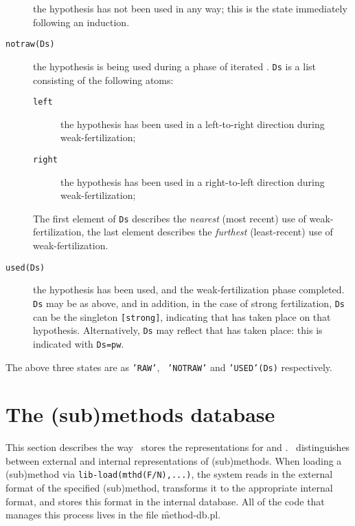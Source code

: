 \begin{description}
\item [] the hypothesis has
not been used in any way; this is the state immediately following an
induction.  

\item [{\tt notraw(Ds)}] the hypothesis is being used during a
phase of iterated .  {\tt Ds} is a list
consisting of the following atoms:
\begin{description}
\item [{\tt left}] the hypothesis has been used in a left-to-right
direction during weak-fertilization;
\item [{\tt right}] the hypothesis has been used in a right-to-left
direction during weak-fertilization;
\end{description}
The first element of {\tt Ds} describes the {\em nearest\/} (most
recent) use of weak-fertilization, the last element describes the {\em
furthest\/} (least-recent) use of weak-fertilization.  

\item [{\tt used(Ds)}]
the hypothesis has been used, and the weak-fertilization phase
completed.  {\tt Ds} may be as above, and in addition, in the case of
strong fertilization, {\tt Ds} can be the singleton {\tt [strong]},
indicating that  has taken place on that
hypothesis.  Alternatively, {\tt Ds} may reflect that  has taken place: this is indicated with {\tt Ds=pw}.  
\end{description}


The above three states are  as {\tt 'RAW'}, {\tt
'NOTRAW'} and {\tt 'USED'(Ds)} respectively.

\section [methods]{The (sub)methods database}
\label{methods-db}

This section describes the way \clam\ stores the representations for
 and . \clam\ distinguishes between external and
internal representations of (sub)methods. When loading a (sub)method
via {\tt lib-load(mthd(F/N),...)}, the system reads in the external
format of the specified (sub)method, transforms it to the appropriate
internal format, and stores this format in the internal database. All
of the code that manages this process lives in the file \f{method-db.pl}.

